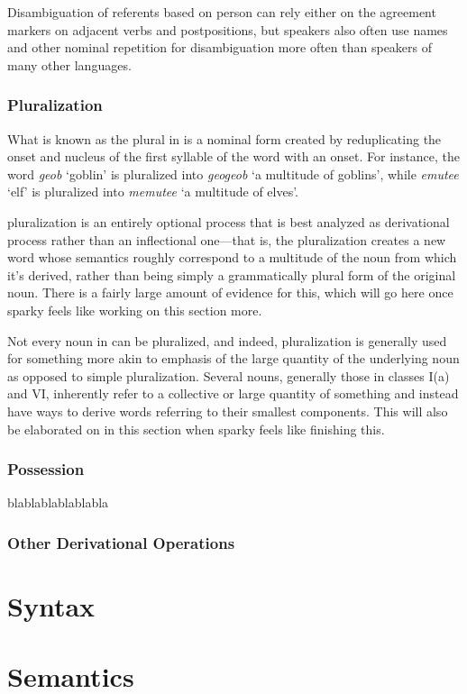 \documentclass[a4paper,11pt,oneside,openany]{memoir}
\begin{document}
Disambiguation of referents based on person can rely either on the agreement markers on adjacent verbs and postpositions, but speakers also often use names and other nominal repetition for disambiguation more often than speakers of many other languages.

\subsection{Pluralization}

What is known as the plural in \lang{} is a nominal form created by reduplicating the onset and nucleus of the first syllable of the word with an onset. For instance, the word \emph{geob} `goblin' is pluralized into \emph{geogeob} `a multitude of goblins', while \emph{emutee} `elf' is pluralized into \emph{memutee} `a multitude of elves'.

\lang{} pluralization is an entirely optional process that is best analyzed as derivational process rather than an inflectional one---that is, the pluralization creates a new word whose semantics roughly correspond to a multitude of the noun from which it's derived, rather than being simply a grammatically plural form of the original noun. There is a fairly large amount of evidence for this, which will go here once sparky feels like working on this section more.

Not every noun in \lang{} can be pluralized, and indeed, pluralization is generally used for something more akin to emphasis of the large quantity of the underlying noun as opposed to simple pluralization. Several nouns, generally those in classes I(a) and VI, inherently refer to a collective or large quantity of something and instead have ways to derive words referring to their smallest components. This will also be elaborated on in this section when sparky feels like finishing this.

\subsection{Possession}\label{ssec:possession}

blablablablablabla

\subsection{Other Derivational Operations}

\chapter{Syntax}

\chapter{Semantics}


\end{document}
